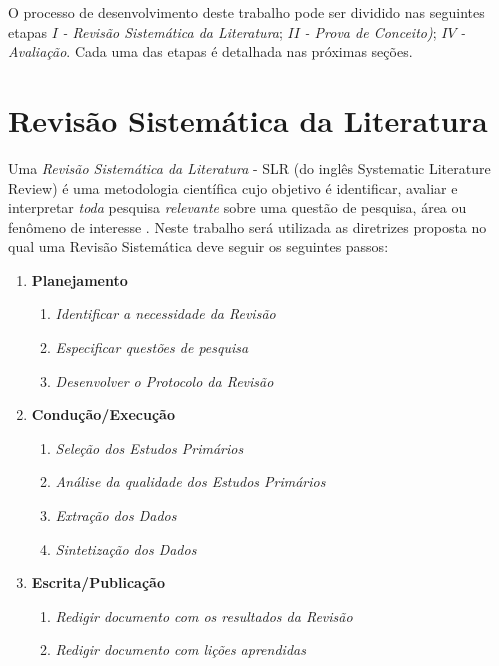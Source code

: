 \documentclass[msc,proposal,hidelot,hideabstract]{ppgccufmg} %
\begin{document}
O processo de desenvolvimento deste trabalho pode ser dividido nas seguintes
etapas $I$\textit{ - Revisão Sistemática da Literatura}; $II$\textit{ - Prova de Conceito)}; $IV$\textit{ - Avaliação}. Cada uma das etapas é detalhada nas próximas seções.

\section{Revisão Sistemática da Literatura}
\label{sec:revisao_sistematica}

Uma \textit{Revisão Sistemática da Literatura} - SLR (do inglês Systematic Literature Review) é uma
metodologia científica cujo objetivo é identificar, avaliar e interpretar
\textit{toda} pesquisa \textit{relevante} sobre uma questão de pesquisa, área
ou fenômeno de interesse \cite{keele2007guidelines,wohlin2012experimentation}. Neste trabalho
será utilizada as diretrizes proposta \cite{keele2007guidelines} no qual uma
Revisão Sistemática deve seguir os seguintes passos:

\begin{enumerate}
  \item \textbf{Planejamento}
  \begin{enumerate}
    \item \textit{Identificar a necessidade da Revisão}
    \item \textit{Especificar questões de pesquisa}
    \item \textit{Desenvolver o Protocolo da Revisão}
  \end{enumerate}
  \item \textbf{Condução/Execução}
  \begin{enumerate}
    \item \textit{Seleção dos Estudos Primários}
    \item \textit{Análise da qualidade dos Estudos Primários}
     \item \textit{Extração dos Dados}
     \item \textit{Sintetização dos Dados}
   \end{enumerate}
  \item \textbf{Escrita/Publicação}
  \begin{enumerate}
    \item \textit{Redigir documento com os resultados da Revisão}
    \item \textit{Redigir documento com lições aprendidas}
  \end{enumerate}
\end{enumerate}
\end{document}
